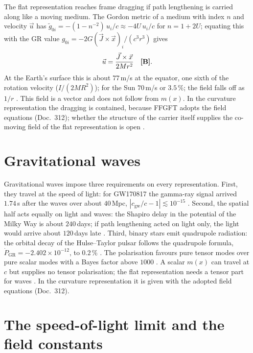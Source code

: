 The flat representation reaches frame dragging if path lengthening is carried along like a moving
medium. The Gordon metric of a medium with index $n$ and velocity $\vec u$ has
$\tilde g_{0i}=-(1-n^{-2})\,u_i/c\approx-4U\,u_i/c$ for $n=1+2U$; equating this with the GR value
$g_{0i}=-2G(\vec J\times\vec x)_i/(c^3r^3)$ gives
\begin{equation}
\vec u=\frac{\vec J\times\vec x}{2Mr^2}\quad\textbf{[B]}.
\end{equation}
At the Earth's surface this is about $77$\,m/s at the equator, one sixth of the rotation velocity
($I/(2MR^2)$); for the Sun $70$\,m/s or $3.5\,\%$; the field falls off as $1/r$ \KM. This field is a
vector and does not follow from $m(x)$. In the curvature representation the dragging is contained,
because FFGFT adopts the field equations (Doc.~312); whether the structure of the carrier itself
supplies the co-moving field of the flat representation is open \SM.

\section{Gravitational waves}

Gravitational waves impose three requirements on every representation. First, they travel at the speed
of light: for GW170817 the gamma-ray signal arrived $1.74$\,s after the waves over about $40$\,Mpc,
$|c_{\text{gw}}/c-1|\lesssim10^{-15}$ \KM. Second, the spatial half acts equally on light and waves: the
Shapiro delay in the potential of the Milky Way is about $240$\,days; if path lengthening acted on light
only, the light would arrive about $120$\,days late \KM. Third, binary stars emit quadrupole radiation:
the orbital decay of the Hulse--Taylor pulsar follows the quadrupole formula,
$\dot P_{\text{GR}}=-2.402\times10^{-12}$, to $0.2\,\%$ \KM. The polarisation favours pure tensor modes
over pure scalar modes with a Bayes factor above $1000$ \QM. A scalar $m(x)$ can travel at $c$ but
supplies no tensor polarisation; the flat representation needs a tensor part for waves \SM. In the curvature representation it is
given with the adopted field equations (Doc.~312).

\section{The speed-of-light limit and the field constants}

